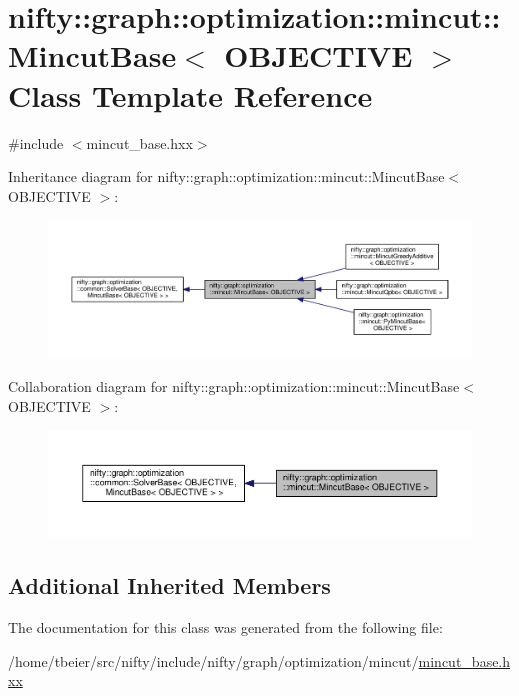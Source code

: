 \hypertarget{classnifty_1_1graph_1_1optimization_1_1mincut_1_1MincutBase}{}\section{nifty\+:\+:graph\+:\+:optimization\+:\+:mincut\+:\+:Mincut\+Base$<$ O\+B\+J\+E\+C\+T\+I\+V\+E $>$ Class Template Reference}
\label{classnifty_1_1graph_1_1optimization_1_1mincut_1_1MincutBase}


{\ttfamily \#include $<$mincut\+\_\+base.\+hxx$>$}



Inheritance diagram for nifty\+:\+:graph\+:\+:optimization\+:\+:mincut\+:\+:Mincut\+Base$<$ O\+B\+J\+E\+C\+T\+I\+V\+E $>$\+:\nopagebreak
\begin{figure}[H]
\begin{center}
\leavevmode
\includegraphics[width=350pt]{classnifty_1_1graph_1_1optimization_1_1mincut_1_1MincutBase__inherit__graph}
\end{center}
\end{figure}


Collaboration diagram for nifty\+:\+:graph\+:\+:optimization\+:\+:mincut\+:\+:Mincut\+Base$<$ O\+B\+J\+E\+C\+T\+I\+V\+E $>$\+:\nopagebreak
\begin{figure}[H]
\begin{center}
\leavevmode
\includegraphics[width=350pt]{classnifty_1_1graph_1_1optimization_1_1mincut_1_1MincutBase__coll__graph}
\end{center}
\end{figure}
\subsection*{Additional Inherited Members}


The documentation for this class was generated from the following file\+:\begin{DoxyCompactItemize}
\item 
/home/tbeier/src/nifty/include/nifty/graph/optimization/mincut/\hyperlink{mincut__base_8hxx}{mincut\+\_\+base.\+hxx}\end{DoxyCompactItemize}

